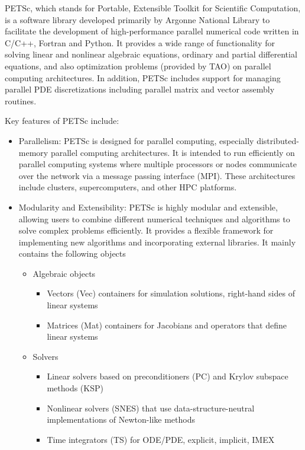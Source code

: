 
PETSc, which stands for Portable, Extensible Toolkit for Scientific Computation, is a software library developed primarily by Argonne National Library to facilitate the development of high-performance parallel numerical code written in C/C++, Fortran and Python.
It provides a wide range of functionality for solving linear and nonlinear algebraic equations, ordinary and partial differential equations, and also optimization problems (provided by TAO) on parallel computing architectures.
In addition, PETSc includes support for managing parallel PDE discretizations including parallel matrix and vector assembly routines.

Key features of PETSc include:
\begin{itemize}
    \item Parallelism: PETSc is designed for parallel computing, especially distributed-memory parallel computing architectures. It is intended to run efficiently on parallel computing systems where multiple processors or nodes communicate over the network via a message passing interface (MPI).
    These architectures include clusters, supercomputers, and other HPC platforms.
    \item Modularity and Extensibility: PETSc is highly modular and extensible, allowing users to combine different numerical techniques and algorithms to solve complex problems efficiently.
    It provides a flexible framework for implementing new algorithms and incorporating external libraries. It mainly contains the following objects
    \begin{itemize}
        \item Algebraic objects 
            \begin{itemize}
                \item Vectors (Vec) containers for simulation solutions, right-hand sides of linear systems
                \item Matrices (Mat) containers for Jacobians and operators that define linear systems
            \end{itemize}
        \item Solvers
            \begin{itemize}
                \item Linear solvers based on preconditioners (PC) and Krylov subspace methods (KSP)
                \item Nonlinear solvers (SNES) that use data-structure-neutral implementations of Newton-like methods
                \item Time integrators (TS) for ODE/PDE, explicit, implicit, IMEX

\end{itemize}
\end{itemize}
\end{itemize}
